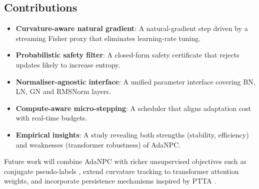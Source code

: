 \documentclass{article} %
\begin{document}
\subsection{Contributions}
\begin{itemize}
  \item \textbf{Curvature-aware natural gradient}: A natural-gradient step driven by a streaming Fisher proxy that eliminates learning-rate tuning.
  \item \textbf{Probabilistic safety filter}: A closed-form safety certificate that rejects updates likely to increase entropy.
  \item \textbf{Normaliser-agnostic interface}: A unified parameter interface covering BN, LN, GN and RMSNorm layers.
  \item \textbf{Compute-aware micro-stepping}: A scheduler that aligns adaptation cost with real-time budgets.
  \item \textbf{Empirical insights}: A study revealing both strengths (stability, efficiency) and weaknesses (transformer robustness) of AdaNPC.
\end{itemize}
Future work will combine AdaNPC with richer unsupervised objectives such as conjugate pseudo-labels \cite{goyal-2022-test}, extend curvature tracking to transformer attention weights, and incorporate persistence mechanisms inspired by PTTA \cite{yuan-2023-robust,hoang-2023-persistent}.
\end{document}
